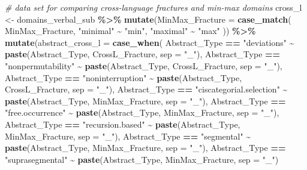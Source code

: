 \documentclass[
]{article}
\newenvironment{Shaded}{\begin{snugshade}}{\end{snugshade}}
\newcommand{\AttributeTok}[1]{\textcolor[rgb]{0.13,0.29,0.53}{#1}}
\newcommand{\CommentTok}[1]{\textcolor[rgb]{0.56,0.35,0.01}{\textit{#1}}}
\newcommand{\FunctionTok}[1]{\textcolor[rgb]{0.13,0.29,0.53}{\textbf{#1}}}
\newcommand{\NormalTok}[1]{#1}
\newcommand{\OtherTok}[1]{\textcolor[rgb]{0.56,0.35,0.01}{#1}}
\newcommand{\SpecialCharTok}[1]{\textcolor[rgb]{0.81,0.36,0.00}{\textbf{#1}}}
\newcommand{\StringTok}[1]{\textcolor[rgb]{0.31,0.60,0.02}{#1}}
\begin{document}
\begin{Shaded}
\begin{Highlighting}[]
\CommentTok{\# data set for comparing cross{-}language fractures and min{-}max domains}
\NormalTok{cross\_l }\OtherTok{\textless{}{-}}\NormalTok{ domains\_verbal\_sub }\SpecialCharTok{\%\textgreater{}\%}
  \FunctionTok{mutate}\NormalTok{(}\AttributeTok{MinMax\_Fracture =} \FunctionTok{case\_match}\NormalTok{(}
\NormalTok{    MinMax\_Fracture,}
    \StringTok{"minimal"} \SpecialCharTok{\textasciitilde{}} \StringTok{"min"}\NormalTok{,}
    \StringTok{"maximal"} \SpecialCharTok{\textasciitilde{}} \StringTok{"max"}
\NormalTok{  )) }\SpecialCharTok{\%\textgreater{}\%}
  \FunctionTok{mutate}\NormalTok{(}\AttributeTok{abstract\_cross\_l =} \FunctionTok{case\_when}\NormalTok{(}
\NormalTok{    Abstract\_Type }\SpecialCharTok{==} \StringTok{"deviations"} \SpecialCharTok{\textasciitilde{}} \FunctionTok{paste}\NormalTok{(Abstract\_Type, CrossL\_Fracture, }\AttributeTok{sep =} \StringTok{"\_"}\NormalTok{),}
\NormalTok{    Abstract\_Type }\SpecialCharTok{==} \StringTok{"nonpermutability"} \SpecialCharTok{\textasciitilde{}} \FunctionTok{paste}\NormalTok{(Abstract\_Type, CrossL\_Fracture, }\AttributeTok{sep =} \StringTok{"\_"}\NormalTok{),}
\NormalTok{    Abstract\_Type }\SpecialCharTok{==} \StringTok{"noninterruption"} \SpecialCharTok{\textasciitilde{}} \FunctionTok{paste}\NormalTok{(Abstract\_Type, CrossL\_Fracture, }\AttributeTok{sep =} \StringTok{"\_"}\NormalTok{),}
\NormalTok{    Abstract\_Type }\SpecialCharTok{==} \StringTok{"ciscategorial.selection"} \SpecialCharTok{\textasciitilde{}} \FunctionTok{paste}\NormalTok{(Abstract\_Type, MinMax\_Fracture, }\AttributeTok{sep =} \StringTok{"\_"}\NormalTok{),}
\NormalTok{    Abstract\_Type }\SpecialCharTok{==} \StringTok{"free.occurrence"} \SpecialCharTok{\textasciitilde{}} \FunctionTok{paste}\NormalTok{(Abstract\_Type, MinMax\_Fracture, }\AttributeTok{sep =} \StringTok{"\_"}\NormalTok{),}
\NormalTok{    Abstract\_Type }\SpecialCharTok{==} \StringTok{"recursion.based"} \SpecialCharTok{\textasciitilde{}} \FunctionTok{paste}\NormalTok{(Abstract\_Type, MinMax\_Fracture, }\AttributeTok{sep =} \StringTok{"\_"}\NormalTok{),}
\NormalTok{    Abstract\_Type }\SpecialCharTok{==} \StringTok{"segmental"} \SpecialCharTok{\textasciitilde{}} \FunctionTok{paste}\NormalTok{(Abstract\_Type, MinMax\_Fracture, }\AttributeTok{sep =} \StringTok{"\_"}\NormalTok{),}
\NormalTok{    Abstract\_Type }\SpecialCharTok{==} \StringTok{"suprasegmental"} \SpecialCharTok{\textasciitilde{}} \FunctionTok{paste}\NormalTok{(Abstract\_Type, MinMax\_Fracture, }\AttributeTok{sep =} \StringTok{"\_"}\NormalTok{)}

\end{Highlighting}
\end{Shaded}
\end{document}
